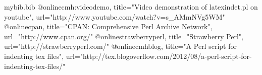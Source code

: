 \begin{filecontents}{mybib.bib}
	@online{cmh:videodemo,
		title="Video demonstration of latexindet.pl on youtube",
		url="http://www.youtube.com/watch?v=s_AMmNVg5WM"}
	@online{cpan,
		title="CPAN: Comprehensive Perl Archive Network",
		url="http://www.cpan.org/"}
	@online{strawberryperl,
		title="Strawberry Perl",
		url="http://strawberryperl.com/"}
	@online{cmhblog,
		title="A Perl script for indenting tex files",
		url="http://tex.blogoverflow.com/2012/08/a-perl-script-for-indenting-tex-files/"}
\end{filecontents}
\documentclass[11pt]{article}
%   
%   
\usepackage[left=4.5cm,right=2.5cm,showframe=false,
top=2cm,bottom=1.5cm]{geometry}               
\usepackage{parskip}
\usepackage{booktabs}
\usepackage{listings}
\usepackage{titlesec}
\usepackage{changepage}
\usepackage{xcolor}
\usepackage{fancyhdr}
\usepackage[sc,format=hang,font=small]{caption}
\usepackage[backend=bibtex]{biblatex}
\usepackage{mdframed}
\usepackage{enumitem}
\usepackage{tikz}
\usetikzlibrary{positioning}
\usepackage{varioref}
\usepackage[colorlinks=true,linkcolor=blue,citecolor=black]{hyperref}
\usepackage{cleveref}




